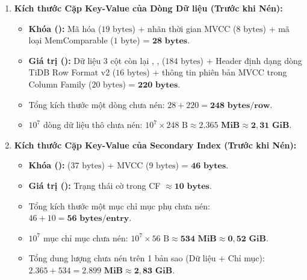 \begin{enumerate}
  \item \textbf{Kích thước Cặp Key-Value của Dòng Dữ liệu (Trước khi Nén):}
  \begin{itemize}
    \item \textbf{Khóa ():} Mã hóa  ($19\text{ bytes}$) + nhãn thời gian MVCC  ($8\text{ bytes}$) + mã loại MemComparable ($1\text{ byte}$) = $\mathbf{28\text{ bytes}}$.
    \item \textbf{Giá trị ():} Dữ liệu 3 cột còn lại , ,  ($184\text{ bytes}$) + Header định dạng dòng TiDB Row Format v2 ($16\text{ bytes}$) + thông tin phiên bản MVCC trong Column Family  ($20\text{ bytes}$) = $\mathbf{220\text{ bytes}}$.
    \item Tổng kích thước một dòng chưa nén: $28 + 220 = \mathbf{248\text{ bytes/row}}$.
    \item $10^7$ dòng dữ liệu thô chưa nén: $10^7 \times 248\text{ B} \approx \mathbf{2.365\text{ MiB} \approx 2,31\text{ GiB}}$.
  \end{itemize}

  \item \textbf{Kích thước Cặp Key-Value của Secondary Index  (Trước khi Nén):}
  \begin{itemize}
    \item \textbf{Khóa ():}  ($37\text{ bytes}$) + MVCC  ($9\text{ bytes}$) = $\mathbf{46\text{ bytes}}$.
    \item \textbf{Giá trị ():} Trạng thái cờ trong CF  $\approx \mathbf{10\text{ bytes}}$.
    \item Tổng kích thước một mục chỉ mục phụ chưa nén: $46 + 10 = \mathbf{56\text{ bytes/entry}}$.
    \item $10^7$ mục chỉ mục chưa nén: $10^7 \times 56\text{ B} \approx \mathbf{534\text{ MiB} \approx 0,52\text{ GiB}}$.
    \item Tổng dung lượng chưa nén trên 1 bản sao (Dữ liệu + Chỉ mục): $2.365 + 534 = \mathbf{2.899\text{ MiB} \approx 2,83\text{ GiB}}$.
  \end{itemize}


\end{enumerate}
